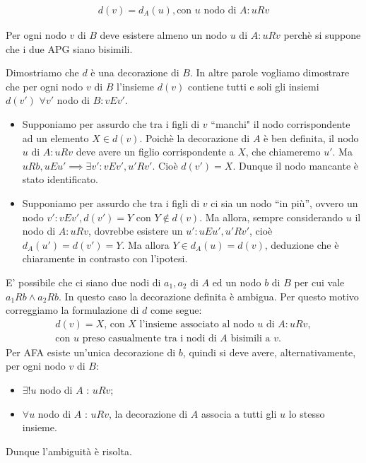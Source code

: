 \begin{proof2}
\begin{enumerate}
\begin{gather*}
                  d(v) = d_A(u), \text{con $u$ nodo di $A$} : u R v
              \end{gather*}
              \begin{nonobservation}
                  Per ogni nodo $v$ di $B$ deve esistere almeno un nodo $u$ di $A : u R v$ perchè si suppone che i due APG siano bisimili.
              \end{nonobservation}
              Dimostriamo che $d$ è una decorazione di $B$. In altre parole vogliamo dimostrare che per ogni nodo $v$ di $B$ l'insieme $d(v)$ contiene tutti e soli gli
              insiemi $d(v') \,\,\forall v'$ nodo di $B : v E v'$.
              \begin{itemize}
                  \item Supponiamo per assurdo che tra i figli di $v$ ``manchi" il nodo corrispondente ad un elemento $X \in d(v)$. Poichè la decorazione di $A$ è ben definita,
                        il nodo $u$ di $A : u R v$ deve avere un figlio corrispondente a $X$, che chiameremo $u'$. Ma $u R b, u E u' \implies \exists v' : v E v', u' R v'$.
                        Cioè $d(v') = X$. Dunque il nodo mancante è stato identificato.
                  \item Supponiamo per assurdo che tra i figli di $v$ ci sia un nodo ``in più'', ovvero un nodo $v' : v E v', d(v') = Y$ con $Y \notin d(v)$. Ma
                        allora, sempre considerando $u$ il nodo di $A : u R v$, dovrebbe esistere un $u' : u E u', u' R v'$, cioè $d_A(u') = d(v') = Y$.
                        Ma allora $Y \in d_A(u) = d(v)$, deduzione che è chiaramente in contrasto con l'ipotesi.
              \end{itemize}
              E' possibile che ci siano due nodi di $a_1, a_2$ di $A$ ed un nodo $b$ di $B$ per cui vale $a_1 R b \land a_2 R b$. In questo caso la decorazione definita è ambigua.
              Per questo motivo correggiamo la formulazione di $d$ come segue:
              \begin{gather*}
                d(v) = X \text{, con $X$ l'insieme associato al nodo $u$ di $A$} : u R v, \\
                \text{con $u$ preso casualmente tra i nodi di $A$ bisimili a $v$.}
              \end{gather*}
              Per AFA esiste un'unica decorazione di $b$, quindi si deve avere, alternativamente, per ogni nodo $v$ di $B$:
              \begin{itemize}
                  \item $\exists ! u$ nodo di $A$ : $u R v$;
                  \item $\forall u$ nodo di $A$ : $u R v$, la decorazione di $A$ associa a tutti gli $u$ lo stesso insieme.
              \end{itemize}
              Dunque l'ambiguità è risolta.
    \end{enumerate}
\end{proof2}
